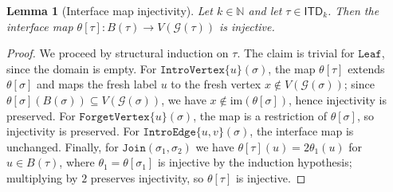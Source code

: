 \documentclass[11pt,a4paper]{article}
\newtheorem{lemma}[theorem]{Lemma}
\newcommand{\treewidthvalue}{k}
\newcommand{\decompositiongraph}[1]{\mathcal{G}(#1)}
\newcommand{\N}{\mathbb{N}}
\newcommand{\vertexset}[1]{V(#1)}
\newcommand{\introvertextype}[1]{\mathtt{IntroVertex}\{#1\}}
\newcommand{\introedgetype}[2]{\mathtt{IntroEdge}\{#1,#2\}}
\newcommand{\forgetvertextype}[1]{\mathtt{ForgetVertex}\{#1\}}
\newcommand{\jointype}{\mathtt{Join}}
\newcommand{\leaftype}{\mathtt{Leaf}}
\newcommand{\topbagname}{B}
\newcommand{\topbag}[1]{\topbagname(#1)}
\newcommand{\allabstractdecompositionstreewidth}[1]{\mathsf{ITD}_{#1}}
\newcommand{\abstractdecomposition}{\tau}
\newcommand{\sigmaabstractdecomposition}{\sigma}
\newcommand{\vertexone}{u}
\newcommand{\vertextwo}{v}
\newcommand{\topmapname}{\theta}
\newcommand{\topmap}[1]{\topmapname[#1]}
\begin{document}
\begin{lemma}[Interface map injectivity]
\label{lemma:itd-interface-map-injective}
Let $\treewidthvalue\in \N$ and let $\abstractdecomposition\in \allabstractdecompositionstreewidth{\treewidthvalue}$.
Then the interface map $\topmap{\abstractdecomposition}:\topbag{\abstractdecomposition}\to \vertexset{\decompositiongraph{\abstractdecomposition}}$ is injective.
\end{lemma}
\begin{proof}
We proceed by structural induction on $\abstractdecomposition$.
The claim is trivial for $\leaftype$, since the domain is empty.
For $\introvertextype{\vertexone}(\sigmaabstractdecomposition)$, the map $\topmap{\abstractdecomposition}$ extends $\topmap{\sigmaabstractdecomposition}$ and maps the fresh label $\vertexone$ to the fresh vertex $x\notin \vertexset{\decompositiongraph{\sigmaabstractdecomposition}}$; since $\topmap{\sigmaabstractdecomposition}(\topbag{\sigmaabstractdecomposition})\subseteq \vertexset{\decompositiongraph{\sigmaabstractdecomposition}}$, we have $x\notin \mathrm{im}(\topmap{\sigmaabstractdecomposition})$, hence injectivity is preserved.
For $\forgetvertextype{\vertexone}(\sigmaabstractdecomposition)$, the map is a restriction of $\topmap{\sigmaabstractdecomposition}$, so injectivity is preserved.
For $\introedgetype{\vertexone}{\vertextwo}(\sigmaabstractdecomposition)$, the interface map is unchanged.
Finally, for $\jointype(\sigmaabstractdecomposition_1,\sigmaabstractdecomposition_2)$ we have $\topmap{\abstractdecomposition}(u)=2\theta_1(u)$ for $u\in \topbag{\abstractdecomposition}$, where $\theta_1=\topmap{\sigmaabstractdecomposition_1}$ is injective by the induction hypothesis; multiplying by $2$ preserves injectivity, so $\topmap{\abstractdecomposition}$ is injective.
\end{proof}
\end{document}
